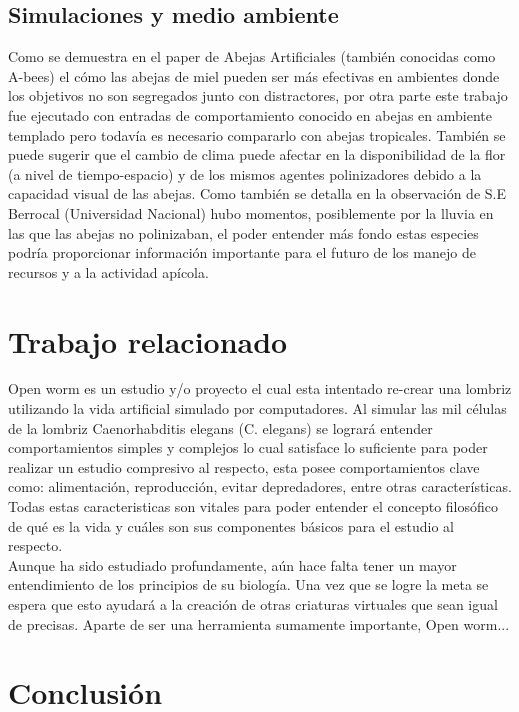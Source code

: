 \documentclass[conference]{IEEEtran}
\begin{document}
\subsection{Simulaciones y medio ambiente}
Como se demuestra en el paper de Abejas Artificiales (tambi\'en conocidas como A-bees) el c\'omo las abejas de miel pueden ser m\'as efectivas en ambientes donde los objetivos no son segregados junto con distractores, por otra parte este trabajo fue ejecutado con entradas de comportamiento conocido en abejas en ambiente templado pero todav\'ia es necesario compararlo con abejas tropicales.
Tambi\'en se puede sugerir que el cambio de clima puede afectar en la disponibilidad de la flor (a nivel de tiempo-espacio) y de los mismos agentes polinizadores debido a la capacidad visual de las abejas. Como tambi\'en se detalla en la observaci\'on de S.E Berrocal (Universidad Nacional) hubo momentos, posiblemente por la lluvia en las que las abejas no polinizaban, el poder entender m\'as fondo estas especies podr\'ia proporcionar informaci\'on importante para el futuro de los manejo de recursos y a la actividad ap\'icola. 


\section{Trabajo relacionado}

Open worm es un estudio y/o proyecto el cual esta intentado re-crear una lombriz utilizando la vida artificial simulado por computadores.  Al simular las mil c\'elulas de la lombriz Caenorhabditis elegans (C. elegans) se lograr\'a entender comportamientos simples y complejos lo cual satisface lo suficiente para poder realizar un estudio compresivo al respecto, esta posee comportamientos clave como: alimentaci\'on, reproducci\'on, evitar depredadores, entre otras caracter\'isticas. \cite{openworm} Todas estas caracteristicas son vitales para poder entender el concepto filos\'ofico de qu\'e es la vida y cu\'ales son sus componentes b\'asicos para el estudio al respecto. \\
Aunque ha sido estudiado profundamente, a\'un hace falta tener un mayor entendimiento de los principios de su biolog\'ia.
Una vez que se logre la meta se espera que esto ayudar\'a a la creaci\'on de otras criaturas virtuales que sean igual de precisas.
Aparte de ser una herramienta sumamente importante, Open worm... %

\section{Conclusi\'on}
\end{document}
